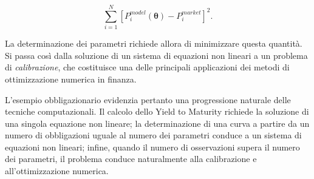 \[
\sum_{i=1}^{N}
\left[
P_i^{model}(\boldsymbol{\theta})
-
P_i^{market}
\right]^2.
\]

La determinazione dei parametri richiede allora di minimizzare questa quantità. Si passa così dalla soluzione di un sistema di equazioni non lineari a un problema di \emph{calibrazione}, che costituisce una delle principali applicazioni dei metodi di ottimizzazione numerica in finanza.

L'esempio obbligazionario evidenzia pertanto una progressione naturale delle tecniche computazionali. Il calcolo dello Yield to Maturity richiede la soluzione di una singola equazione non lineare; la determinazione di una curva a partire da un numero di obbligazioni uguale al numero dei parametri conduce a un sistema di equazioni non lineari; infine, quando il numero di osservazioni supera il numero dei parametri, il problema conduce naturalmente alla calibrazione e all'ottimizzazione numerica.

